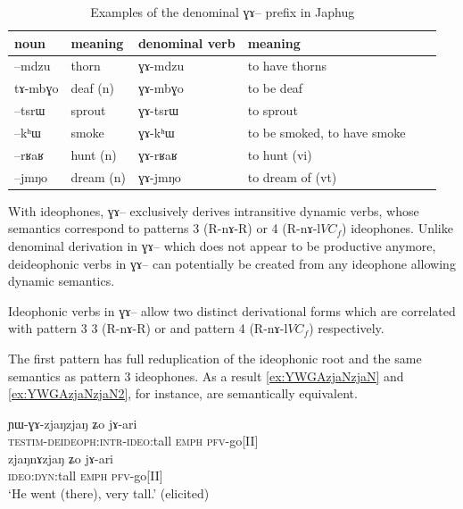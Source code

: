 \documentclass[oldfontcommands,oneside,a4paper,11pt]{article}
\newcommand{\ipa}[1]{{\phon \mbox{#1}}} %
\begin{document}
 \begin{table}[h]
 \caption{Examples of the denominal \ipa{ɣɤ--} prefix in Japhug} \label{tab:denom.GA}
\begin{tabular}{llllll}
\toprule
noun &meaning &denominal verb & meaning\\
\midrule
 \ipa{--mdzu} &thorn & \ipa{ɣɤ-mdzu} &to have thorns \\
  \ipa{tɤ-mbɣo} &deaf (n) & \ipa{ɣɤ-mbɣo} &to be deaf \\
\midrule
 \ipa{--tsrɯ} &sprout & \ipa{ɣɤ-tsrɯ} &to sprout\\
  \ipa{--kʰɯ} &smoke & \ipa{ɣɤ-kʰɯ} &to be smoked, to have smoke \\
    \midrule
  \ipa{--rʁaʁ} &hunt (n) & \ipa{ɣɤ-rʁaʁ} &to hunt (vi) \\
   \ipa{--jmŋo} &dream (n) & \ipa{ɣɤ-jmŋo} &to dream of (vt) \\ 
  \bottomrule
  \end{tabular}
 \end{table}
 
 With ideophones, \ipa{ɣɤ--} exclusively derives intransitive dynamic verbs, whose semantics correspond to patterns 3 (R-\ipa{nɤ}-R) or 4 (R-\ipa{nɤ-l}$VC_f$) ideophones. Unlike denominal derivation in \ipa{ɣɤ--} which does not appear to be productive anymore,  deideophonic verbs in \ipa{ɣɤ--} can potentially be created from any ideophone allowing dynamic semantics.
 
Ideophonic verbs in \ipa{ɣɤ--} allow two distinct derivational forms which are correlated with pattern 3 3 (R-\ipa{nɤ}-R) or  and pattern 4 (R-\ipa{nɤ-l}$VC_f$) respectively.

 The first pattern has full reduplication of the ideophonic root and the same semantics as pattern 3 ideophones. As a result  \ref{ex:YWGAzjaNzjaN} and \ref{ex:YWGAzjaNzjaN2}, for instance, are semantically equivalent. 

 		 

     \begin{exe}
\ex \label{ex:YWGAzjaNzjaN}
\gll 
 \ipa{ɲɯ-ɣɤ-zjaŋzjaŋ}  	\ipa{ʑo}  	\ipa{jɤ-ari}  \\
 \textsc{testim-deideoph:intr-ideo}:tall   \textsc{emph} \textsc{pfv}-go[II]\\
 \ex \label{ex:YWGAzjaNzjaN2}
\gll 
 \ipa{zjaŋnɤzjaŋ}  	\ipa{ʑo}  	\ipa{jɤ-ari}  \\
 \textsc{ideo:dyn}:tall   \textsc{emph} \textsc{pfv}-go[II]\\
 \glt `He went (there), very tall.' (elicited)
\end{exe}
\end{document}
